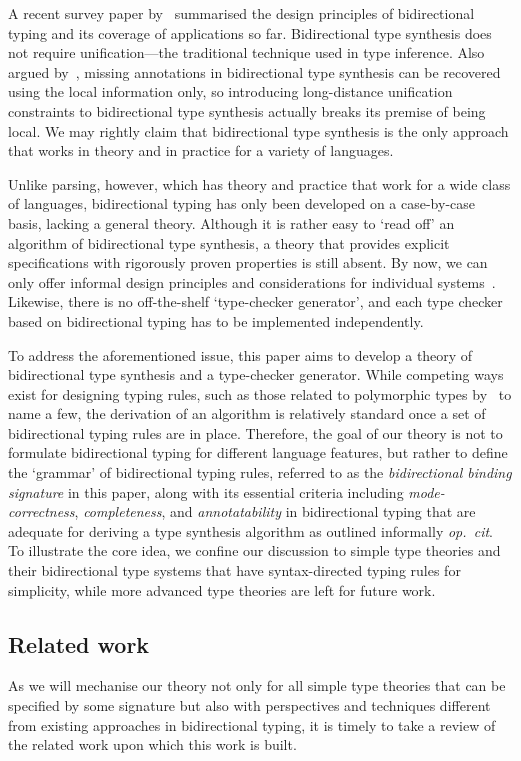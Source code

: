   A recent survey paper by~\citet{Dunfield2021} summarised the design principles of bidirectional typing and its coverage of applications so far.
  Bidirectional type synthesis does not require unification---the traditional technique used in type inference.
Also argued by~\citet{Pierce2000}, missing annotations in bidirectional type synthesis can be recovered using the local information only, so introducing long-distance unification constraints to bidirectional type synthesis actually breaks its premise of being local.
 We may rightly claim that bidirectional type synthesis is the only approach that works in theory and in practice for a variety of languages.

Unlike parsing, however, which has theory and practice that work for a wide class of languages, bidirectional typing has only been developed on a case-by-case basis, lacking a general theory.
Although it is rather easy to `read off' an algorithm of bidirectional type synthesis, a theory that provides explicit specifications with rigorously proven properties is still absent.
By now, we can only offer informal design principles and considerations for individual systems~\citep{Dunfield2021}.
Likewise, there is no off-the-shelf `type-checker generator', and each type checker based on bidirectional typing has to be implemented independently.

To address the aforementioned issue, this paper aims to develop a theory of bidirectional type synthesis and a type-checker generator.
While competing ways exist for designing typing rules, such as those related to polymorphic types by~\citet{Pierce2000,Peyton-Jones2007,Dunfield2013,Xie2018} to name a few, the derivation of an algorithm is relatively standard once a set of bidirectional typing rules are in place.
Therefore, the goal of our theory is not to formulate bidirectional typing for different language features, but rather to define the `grammar' of bidirectional typing rules, referred to as the \emph{bidirectional binding signature} in this paper, along with its essential criteria including \emph{mode-correctness}, \emph{completeness}, and \emph{annotatability} in bidirectional typing that are adequate for deriving a type synthesis algorithm as outlined informally \emph{op.\ cit}.
To illustrate the core idea, we confine our discussion to simple type theories and their bidirectional type systems that have syntax-directed typing rules for simplicity, while more advanced type theories are left for future work.

\subsection{Related work}
As we will mechanise our theory not only for all simple type theories that can be specified by some signature but also with perspectives and techniques different from existing approaches in bidirectional typing, it is timely to take a review of the related work upon which this work is built.

